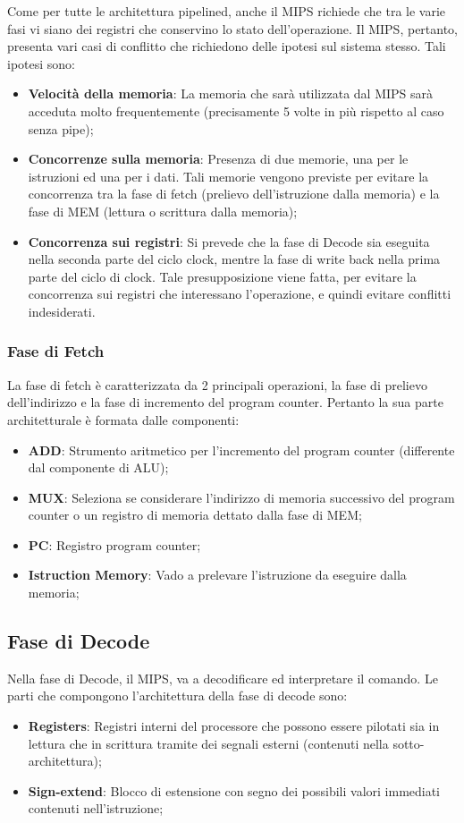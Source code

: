 Come per tutte le architettura pipelined, anche il MIPS richiede che tra le varie fasi vi siano dei registri che conservino lo stato dell'operazione.
Il MIPS, pertanto, presenta vari casi di conflitto che richiedono delle ipotesi sul sistema stesso. Tali ipotesi sono:
\begin{itemize}
    \item \textbf{Velocità della memoria}: La memoria che sarà utilizzata dal MIPS sarà acceduta molto frequentemente (precisamente 5 volte in più rispetto al caso senza pipe);
    \item \textbf{Concorrenze sulla memoria}: Presenza di due memorie, una per le istruzioni ed una per i dati. Tali memorie vengono previste per evitare la concorrenza tra la fase di fetch (prelievo dell'istruzione dalla memoria) e la fase di MEM (lettura o scrittura dalla memoria);
    \item \textbf{Concorrenza sui registri}: Si prevede che la fase di Decode sia eseguita nella seconda parte del ciclo clock, mentre la fase di write back nella prima parte del ciclo di clock. Tale presupposizione viene fatta, per evitare la concorrenza sui registri che interessano l'operazione, e quindi evitare conflitti indesiderati.
\end{itemize}

\subsubsection{Fase di Fetch}
La fase di fetch è caratterizzata da 2 principali operazioni, la fase di prelievo dell'indirizzo e la fase di incremento del program counter. Pertanto la sua parte architetturale è formata dalle componenti:
\begin{itemize}
    \item \textbf{ADD}: Strumento aritmetico per l'incremento del program counter (differente dal componente di ALU);
    \item \textbf{MUX}: Seleziona se considerare l'indirizzo di memoria successivo del program counter o un registro di memoria dettato dalla fase di MEM;
    \item \textbf{PC}: Registro program counter;
    \item \textbf{Istruction Memory}: Vado a prelevare l'istruzione da eseguire dalla memoria;
\end{itemize}

\subsection{Fase di Decode}
Nella fase di Decode, il MIPS, va a decodificare ed interpretare il comando. Le parti che compongono l'architettura della fase di decode sono:
\begin{itemize}
    \item \textbf{Registers}: Registri interni del processore che possono essere pilotati sia in lettura che in scrittura tramite dei segnali esterni (contenuti nella sotto-architettura);
    \item \textbf{Sign-extend}: Blocco di estensione con segno dei possibili valori immediati contenuti nell'istruzione;
\end{itemize}


